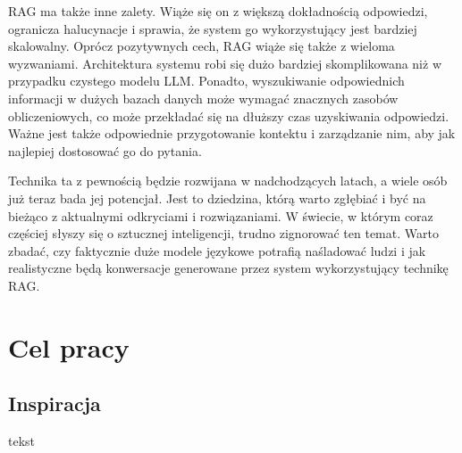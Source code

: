RAG ma także inne zalety. Wiąże się on z większą dokładnością odpowiedzi, ogranicza halucynacje i sprawia, że system go wykorzystujący jest bardziej skalowalny. Oprócz pozytywnych cech, RAG wiąże się także z wieloma wyzwaniami. Architektura systemu robi się dużo bardziej skomplikowana niż w przypadku czystego modelu LLM. Ponadto, wyszukiwanie odpowiednich informacji w dużych bazach danych może wymagać znacznych zasobów obliczeniowych, co może przekładać się na dłuższy czas uzyskiwania odpowiedzi. Ważne jest także odpowiednie przygotowanie kontektu i zarządzanie nim, aby jak najlepiej dostosować go do pytania.

Technika ta z pewnością będzie rozwijana w nadchodzących latach, a wiele osób już teraz bada jej potencjał. Jest to dziedzina, którą warto zgłębiać i być na bieżąco z aktualnymi odkryciami i rozwiązaniami. W świecie, w którym coraz częściej słyszy się o sztucznej inteligencji, trudno zignorować ten temat. Warto zbadać, czy faktycznie duże modele językowe potrafią naśladować ludzi i jak realistyczne będą konwersacje generowane przez system wykorzystujący technikę RAG.


\section{Cel pracy}

\subsection{Inspiracja}

tekst